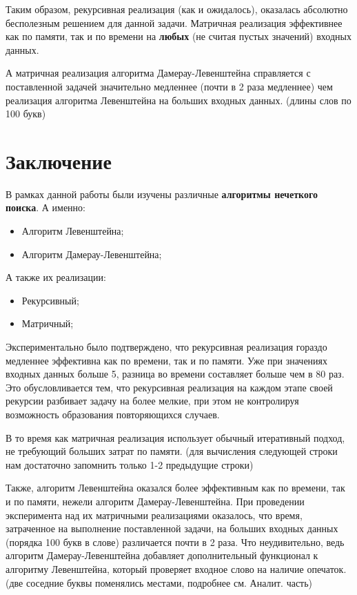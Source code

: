 \documentclass[12pt]{report}
\begin{document}
    Таким образом, рекурсивная реализация (как и ожидалось), оказалась абсолютно бесполезным решением для данной задачи. Матричная реализация эффективнее как по памяти, так и по времени на {\bf любых} (не считая пустых значений) входных данных.
    
    А матричная реализация алгоритма Дамерау-Левенштейна справляется с поставленной задачей значительно медленнее (почти в 2 раза медленнее) чем реализация алгоритма Левенштейна на больших входных данных. (длины слов по 100 букв)
    
    \chapter*{Заключение}
    
    В рамках данной работы были изучены различные {\bf алгоритмы нечеткого поиска}. А именно:
    \begin{itemize}
    	\item Алгоритм Левенштейна;
    	\item Алгоритм Дамерау-Левенштейна;
    \end{itemize}
    
    А также их реализации:
    \begin{itemize}
    	\item Рекурсивный;
    	\item Матричный;
    \end{itemize}

    Экспериментально было подтверждено, что рекурсивная реализация гораздо медленнее эффективна как по времени, так и по памяти. Уже при значениях входных данных больше 5, разница во времени составляет больше чем в 80 раз. Это обусловливается тем, что рекурсивная реализация на каждом этапе своей рекурсии разбивает задачу на более мелкие, при этом не контролируя возможность образования повторяющихся случаев.
    
    В то время как матричная реализация использует обычный итеративный подход, не требующий больших затрат по памяти. (для вычисления следующей строки нам достаточно запомнить только 1-2 предыдущие строки)
    
    Также, алгоритм Левенштейна оказался более эффективным как по времени, так и по памяти, нежели алгоритм Дамерау-Левенштейна. При проведении эксперимента над их матричными реализациями оказалось, что время, затраченное на выполнение поставленной задачи, на больших входных данных (порядка 100 букв в слове) различается почти в 2 раза. Что неудивительно, ведь алгоритм Дамерау-Левенштейна добавляет дополнительный функционал к алгоритму Левенштейна, который проверяет входное слово на наличие опечаток. (две соседние буквы поменялись местами, подробнее см. Аналит. часть)
    
\end{document}
